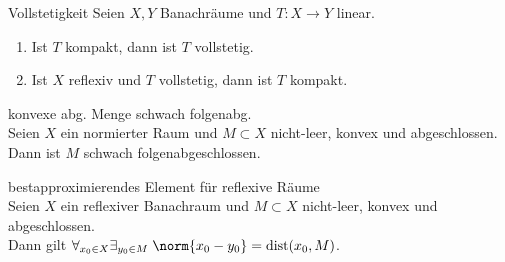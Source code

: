 \begin{Satz}{Vollstetigkeit}
    Seien $X, Y$ Banachräume und $T\colon X \rightarrow Y$ linear.
    \begin{enumerate}
        \item
        Ist $T$ kompakt, dann ist $T$ vollstetig.

        \item
        Ist $X$ reflexiv und $T$ vollstetig, dann ist $T$ kompakt.
    \end{enumerate}
\end{Satz}

\linie

\begin{Satz}{konvexe abg. Menge schwach folgenabg.}\\
    Seien $X$ ein normierter Raum und $M \subset X$
    nicht-leer, konvex und abgeschlossen.\\
    Dann ist $M$ schwach folgenabgeschlossen.
\end{Satz}

\linie

\begin{Satz}{bestapproximierendes Element für reflexive Räume}\\
    Seien $X$ ein reflexiver Banachraum und $M \subset X$
    nicht-leer, konvex und abgeschlossen.\\
    Dann gilt $\forall_{x_0 \in X} \exists_{y_0 \in M}\;
    \norm{x_0 - y_0} = \dist(x_0, M)$.
\end{Satz}

\pagebreak
